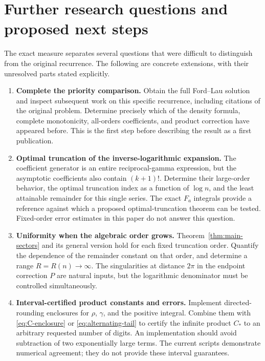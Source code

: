 \section{Further research questions and proposed next steps}
\label{sec:future}

The exact measure separates several questions that were difficult to
distinguish from the original recurrence. The following are concrete
extensions, with their unresolved parts stated explicitly.

\begin{enumerate}[leftmargin=*]
\item \textbf{Complete the priority comparison.}
Obtain the full Ford--Lau solution and inspect subsequent work on this
specific recurrence, including citations of the original problem.
Determine precisely which of the density formula, complete
monotonicity, all-orders coefficients, and product correction have
appeared before. This is the first step before describing the result
as a first publication.

\item \textbf{Optimal truncation of the inverse-logarithmic expansion.}
The coefficient generator is an entire reciprocal-gamma expression,
but the asymptotic coefficients also contain $(k+1)!$. Determine their
large-order behavior, the optimal truncation index as a function of
$\log n$, and the least attainable remainder for this single series.
The exact $F_a$ integrals provide a reference against which a proposed
optimal-truncation theorem can be tested. Fixed-order error estimates
in this paper do not answer this question.

\item \textbf{Uniformity when the algebraic order grows.}
Theorem~\ref{thm:main-sectors} and its general version hold for each
fixed truncation order. Quantify the dependence of the remainder
constant on that order, and determine a range $R=R(n)\to\infty$.
The singularities at distance $2\pi$ in the endpoint correction
$P$ are natural inputs, but the logarithmic denominator must be
controlled simultaneously.

\item \textbf{Interval-certified product constants and errors.}
Implement directed-rounding enclosures for $\rho$, $\gamma$, and
the positive integral. Combine them with
\eqref{eq:C-enclosure} or \eqref{eq:alternating-tail} to certify
the infinite product $C_*$ to an arbitrary requested number of digits.
An implementation should avoid subtraction of two exponentially large
terms. The current scripts demonstrate numerical agreement; they do
not provide these interval guarantees.


\end{enumerate}
